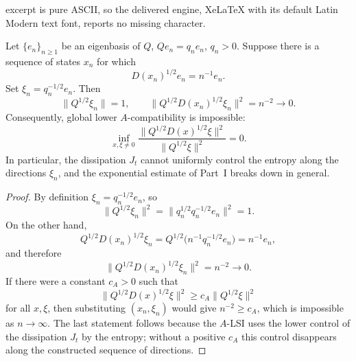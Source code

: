 \documentclass[10pt,a4paper]{amsart}
\begin{document}
excerpt is pure ASCII, so the delivered engine, XeLaTeX with its default Latin Modern text font, reports no missing character.
\begin{proposition}
\label{prop:nondegeneracy-counterexample}
Let \(\{e_n\}_{n\ge1}\) be an eigenbasis of \(Q\), \(Qe_n=q_ne_n\), \(q_n>0\).
Suppose there is a sequence of states \(x_n\) for which
\[
        D(x_n)^{1/2}e_n=n^{-1}e_n .
\]
Set \(\xi_n=q_n^{-1/2}e_n\). Then
\[
        \|Q^{1/2}\xi_n\|=1,
        \qquad
        \|Q^{1/2}D(x_n)^{1/2}\xi_n\|^2=n^{-2}\to0 .
\]
Consequently, global lower \(A\)-compatibility is impossible:
\[
        \inf_{x,\xi\ne0}
        \frac{\|Q^{1/2}D(x)^{1/2}\xi\|^2}{\|Q^{1/2}\xi\|^2}=0 .
\]
In particular, the dissipation \(J_t\) cannot uniformly control the entropy along
the directions \(\xi_n\), and the exponential estimate of Part~I breaks down in
general.
\end{proposition}

\begin{proof}
By definition \(\xi_n=q_n^{-1/2}e_n\), so
\[
        \|Q^{1/2}\xi_n\|^2
        =\|q_n^{1/2}q_n^{-1/2}e_n\|^2=1 .
\]
On the other hand,
\[
        Q^{1/2}D(x_n)^{1/2}\xi_n
        =Q^{1/2}\bigl(n^{-1}q_n^{-1/2}e_n\bigr)
        =n^{-1}e_n,
\]
and therefore
\[
        \|Q^{1/2}D(x_n)^{1/2}\xi_n\|^2=n^{-2}\to0 .
\]
If there were a constant \(c_A>0\) such that
\[
        \|Q^{1/2}D(x)^{1/2}\xi\|^2
        \ge c_A\|Q^{1/2}\xi\|^2
\]
for all \(x,\xi\), then substituting \((x_n,\xi_n)\) would give
\(n^{-2}\ge c_A\), which is impossible as \(n\to\infty\). The last statement
follows because the \(A\)-LSI uses the lower control of the dissipation \(J_t\) by
the entropy; without a positive \(c_A\) this control disappears along the
constructed sequence of directions.
\end{proof}
\end{document}
